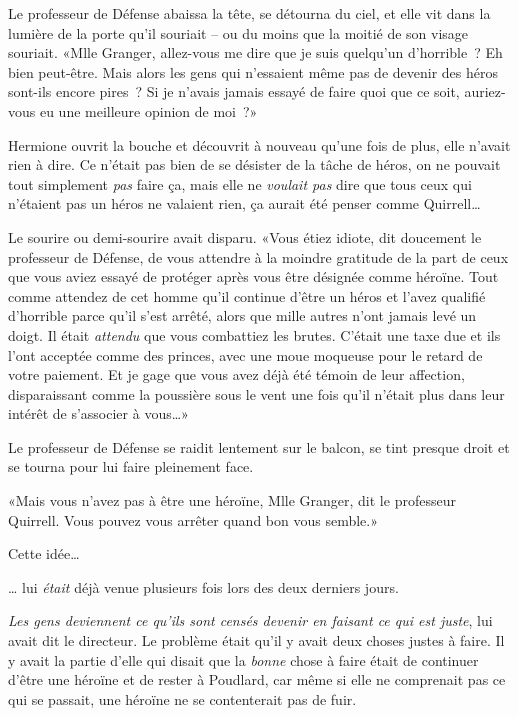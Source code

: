 Le professeur de Défense abaissa la tête, se détourna du ciel, et elle vit dans la lumière de la porte qu'il souriait -- ou du moins que la moitié de son visage souriait. «Mlle Granger, allez-vous me dire que je suis quelqu'un d'horrible~? Eh bien peut-être. Mais alors les gens qui n'essaient même pas de devenir des héros sont-ils encore pires~? Si je n'avais jamais essayé de faire quoi que ce soit, auriez-vous eu une meilleure opinion de moi~?»

Hermione ouvrit la bouche et découvrit à nouveau qu'une fois de plus, elle n'avait rien à dire. Ce n'était pas bien de se désister de la tâche de héros, on ne pouvait tout simplement \emph{pas} faire ça, mais elle ne \emph{voulait pas} dire que tous ceux qui n'étaient pas un héros ne valaient rien, ça aurait été penser comme Quirrell…

Le sourire ou demi-sourire avait disparu. «Vous étiez idiote, dit doucement le professeur de Défense, de vous attendre à la moindre gratitude de la part de ceux que vous aviez essayé de protéger après vous être désignée comme héroïne. Tout comme attendez de cet homme qu'il continue d'être un héros et l'avez qualifié d'horrible parce qu'il s'est arrêté, alors que mille autres n'ont jamais levé un doigt. Il était \emph{attendu} que vous combattiez les brutes. C'était une taxe due et ils l'ont acceptée comme des princes, avec une moue moqueuse pour le retard de votre paiement. Et je gage que vous avez déjà été témoin de leur affection, disparaissant comme la poussière sous le vent une fois qu'il n'était plus dans leur intérêt de s'associer à vous…»

Le professeur de Défense se raidit lentement sur le balcon, se tint presque droit et se tourna pour lui faire pleinement face.

«Mais vous n'avez pas à être une héroïne, Mlle Granger, dit le professeur Quirrell. Vous pouvez vous arrêter quand bon vous semble.»

Cette idée…

… lui \emph{était} déjà venue plusieurs fois lors des deux derniers jours.

\emph{Les gens deviennent ce qu'ils sont censés devenir en faisant ce qui est juste}, lui avait dit le directeur. Le problème était qu'il y avait deux choses justes à faire. Il y avait la partie d'elle qui disait que la \emph{bonne} chose à faire était de continuer d'être une héroïne et de rester à Poudlard, car même si elle ne comprenait pas ce qui se passait, une héroïne ne se contenterait pas de fuir.


